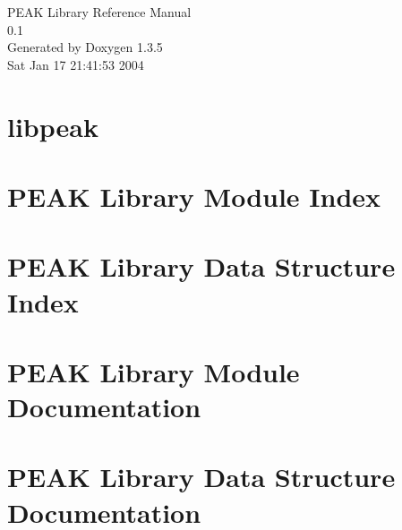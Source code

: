 \documentclass[a4paper]{book}
\begin{document}
\begin{titlepage}
\vspace*{7cm}
\begin{center}
{\Large PEAK Library Reference Manual\\[1ex]\large 0.1 }\\
\vspace*{1cm}
{\large Generated by Doxygen 1.3.5}\\
\vspace*{0.5cm}
{\small Sat Jan 17 21:41:53 2004}\\
\end{center}
\end{titlepage}
\clearemptydoublepage
{}
\tableofcontents
\clearemptydoublepage
{}
\chapter{libpeak }
\label{index}\hypertarget{index}{}
\chapter{PEAK Library Module Index}

\chapter{PEAK Library Data Structure Index}

\chapter{PEAK Library Module Documentation}




















\chapter{PEAK Library Data Structure Documentation}




\printindex
\end{document}

